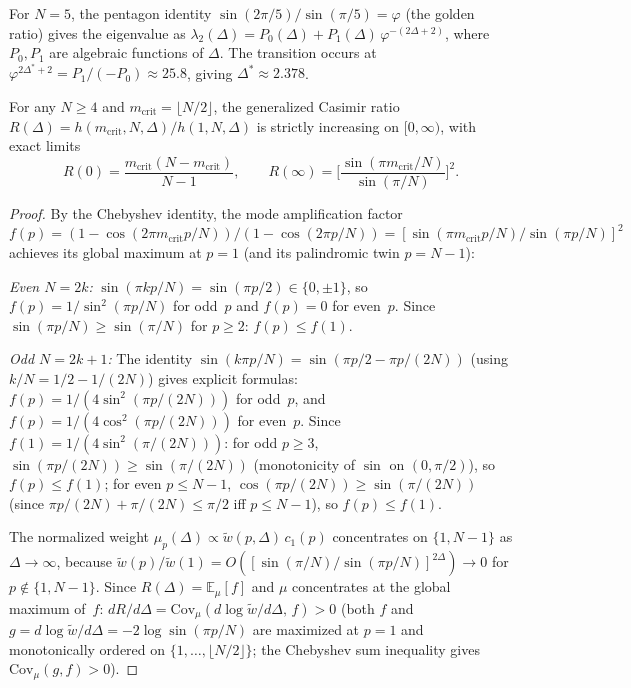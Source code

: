 For $N = 5$, the pentagon identity
$\sin(2\pi/5)/\sin(\pi/5) = \varphi$ (the golden ratio)
gives the eigenvalue as
$\lambda_2(\Delta) = P_0(\Delta) + P_1(\Delta)\,\varphi^{-(2\Delta+2)}$,
where $P_0, P_1$ are algebraic functions of $\Delta$.
The transition occurs at $\varphi^{2\Delta^*+2} = P_1/({-P_0})
\approx 25.8$, giving $\Delta^* \approx 2.378$.

\begin{theorem}
\label{thm:rg-monotonicity}
For any $N \ge 4$ and $m_{\mathrm{crit}} = \lfloor N/2 \rfloor$,
the generalized Casimir ratio
$R(\Delta) = h(m_{\mathrm{crit}}, N, \Delta) / h(1, N, \Delta)$
is strictly increasing on $[0, \infty)$, with exact limits
\begin{equation}\label{eq:rg-limits}
  R(0) = \frac{m_{\mathrm{crit}}(N{-}m_{\mathrm{crit}})}{N{-}1},
  \qquad
  R(\infty) = \biggl[\frac{\sin(\pi m_{\mathrm{crit}}/N)}
                          {\sin(\pi/N)}\biggr]^2.
\end{equation}
\end{theorem}

\begin{proof}
By the Chebyshev identity, the mode amplification factor
$f(p) = (1{-}\cos(2\pi m_{\mathrm{crit}} p/N))/(1{-}\cos(2\pi p/N))
= [\sin(\pi m_{\mathrm{crit}} p/N)/\sin(\pi p/N)]^2$
achieves its global maximum at $p = 1$ (and its palindromic twin
$p = N{-}1$):

\emph{Even $N = 2k$:}
$\sin(\pi kp/N) = \sin(\pi p/2) \in \{0, \pm 1\}$, so
$f(p) = 1/\sin^2(\pi p/N)$ for odd~$p$ and $f(p) = 0$ for even~$p$.
Since $\sin(\pi p/N) \ge \sin(\pi/N)$ for $p \ge 2$: $f(p) \le f(1)$.

\emph{Odd $N = 2k{+}1$:}
The identity $\sin(k\pi p/N) = \sin(\pi p/2 - \pi p/(2N))$
(using $k/N = 1/2 - 1/(2N)$) gives explicit formulas:
$f(p) = 1/(4\sin^2(\pi p/(2N)))$ for odd~$p$, and
$f(p) = 1/(4\cos^2(\pi p/(2N)))$ for even~$p$.
Since $f(1) = 1/(4\sin^2(\pi/(2N)))$:
for odd $p \ge 3$, $\sin(\pi p/(2N)) \ge \sin(\pi/(2N))$
(monotonicity of $\sin$ on $(0,\pi/2)$), so $f(p) \le f(1)$;
for even $p \le N{-}1$, $\cos(\pi p/(2N)) \ge \sin(\pi/(2N))$
(since $\pi p/(2N) + \pi/(2N) \le \pi/2$ iff $p \le N{-}1$),
so $f(p) \le f(1)$.

The normalized weight $\mu_p(\Delta) \propto \tilde{w}(p,\Delta)\,c_1(p)$
concentrates on $\{1, N{-}1\}$ as $\Delta \to \infty$, because
$\tilde{w}(p)/\tilde{w}(1) = O([\sin(\pi/N)/\sin(\pi p/N)]^{2\Delta})
\to 0$ for $p \notin \{1, N{-}1\}$.
Since $R(\Delta) = \mathbb{E}_\mu[f]$ and $\mu$ concentrates at the
global maximum of~$f$:
$dR/d\Delta = \mathrm{Cov}_\mu(d\log\tilde{w}/d\Delta,\, f) > 0$
(both $f$ and $g = d\log\tilde{w}/d\Delta = -2\log\sin(\pi p/N)$
are maximized at $p = 1$ and monotonically ordered on
$\{1,\ldots,\lfloor N/2\rfloor\}$; the Chebyshev sum inequality
gives $\mathrm{Cov}_\mu(g, f) > 0$).
\end{proof}

